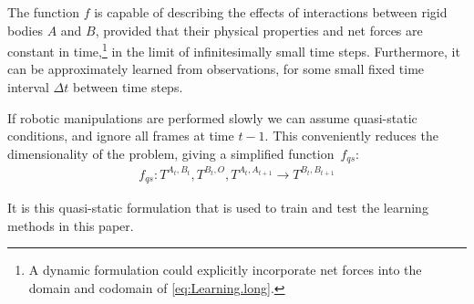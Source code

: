 The function $f$ is capable of describing the effects of interactions between rigid bodies $A$ and $B$, provided that their physical properties and net forces are constant
in time,\footnote{A dynamic formulation could explicitly incorporate
net forces into the domain and codomain of \eqref{eq:Learning.long}.}
in the limit of infinitesimally small time steps.
Furthermore, it can be approximately learned from observations,
for some small fixed time interval $\Delta t$ between time steps.

If robotic manipulations are performed slowly we can assume quasi-static conditions, and ignore all frames at time $t-1$.  This conveniently reduces the dimensionality of the problem, giving a simplified function~$f_{qs}$:
\begin{multline}
f_{qs}: T^{A_t, B_t}, T^{B_t, O}, T^{A_{t}, A_{t+1}} \longrightarrow T^{B_{t}, B_{t+1}}
\label{eq:Learning.short}
\end{multline}

It is this quasi-static formulation that is used to train and test the learning methods in this paper.

